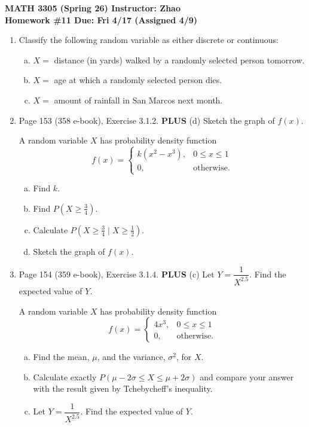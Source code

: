 \documentclass[12pt]{article}
\begin{document}
\begin{center}
  \textbf{\large MATH 3305 (Spring 26) \hfill Instructor: Zhao}\\[4pt]
  \textbf{\large Homework \#11 \hfill Due: Fri 4/17 (Assigned 4/9)}
\end{center}

\bigskip

\begin{enumerate}
  \item Classify the following random variable as either discrete or continuous:
    \begin{enumerate}[(a)]
      \item $X =$ distance (in yards) walked by a randomly selected person tomorrow.
      \item $X =$ age at which a randomly selected person dies.
      \item $X =$ amount of rainfall in San Marcos next month.
    \end{enumerate}

  \item Page 153 (358 e-book), Exercise 3.1.2. \textbf{PLUS} (d) Sketch the graph of $f(x)$.

    A random variable $X$ has probability density function
    \[
      f(x) = \begin{cases} k(x^2 - x^3), & 0 \le x \le 1 \\[4pt] 0, & \text{otherwise.} \end{cases}
    \]
    \begin{enumerate}[(a)]
      \item Find $k$.
      \item Find $P\!\left(X \ge \tfrac{3}{4}\right)$.
      \item Calculate $P\!\left(X \ge \tfrac{3}{4} \;\big|\; X \ge \tfrac{1}{2}\right)$.
      \item Sketch the graph of $f(x)$.
    \end{enumerate}

  \item Page 154 (359 e-book), Exercise 3.1.4. \textbf{PLUS} (c) Let $Y = \dfrac{1}{X^{2.5}}$. Find the expected value of $Y$.

    A random variable $X$ has probability density function
    \[
      f(x) = \begin{cases} 4x^3, & 0 \le x \le 1 \\[4pt] 0, & \text{otherwise.} \end{cases}
    \]
    \begin{enumerate}[(a)]
      \item Find the mean, $\mu$, and the variance, $\sigma^2$, for $X$.
      \item Calculate exactly $P(\mu - 2\sigma \le X \le \mu + 2\sigma)$ and compare your answer with the result given by Tchebycheff's inequality.
      \item Let $Y = \dfrac{1}{X^{2.5}}$. Find the expected value of $Y$.
    \end{enumerate}


\end{enumerate}
\end{document}
